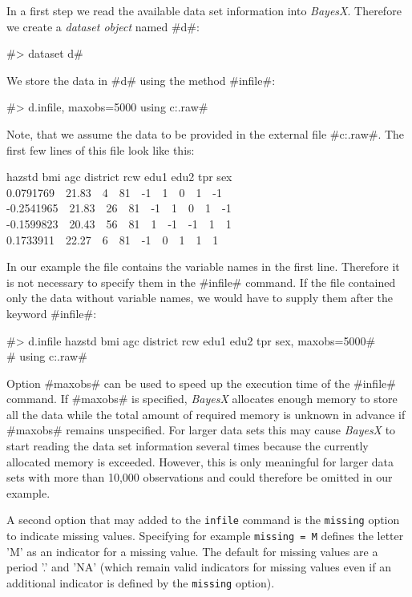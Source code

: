 \documentclass[11pt,a4paper,twoside]{bayesxreport}
\begin{document}
In a first step we read the available data set information into {\it
BayesX}. Therefore we create a {\it dataset object} named #d#:

#> dataset d#

We store the data in #d# using the method #infile#:

#> d.infile, maxobs=5000 using c:\data\zambia.raw#

Note, that we assume the data to be provided in the external file
#c:\data\zambia.raw#. The first few lines of this file look like
this:

{\footnotesize
 hazstd bmi agc district rcw edu1 edu2 tpr sex\\
 0.0791769 \,\, 21.83 \,\, 4 \,\, 81 \,\, -1 \,\, 1 \,\, 0 \,\, 1 \,\, -1\\
 -0.2541965 \,\, 21.83 \,\, 26 \,\, 81 \,\, -1 \,\, 1 \,\, 0 \,\, 1 \,\, -1\\
 -0.1599823 \,\, 20.43 \,\, 56 \,\, 81 \,\, 1 \,\, -1 \,\, -1 \,\, 1 \,\, 1\\
 0.1733911 \,\, 22.27 \,\, 6 \,\, 81 \,\, -1 \,\, 0 \,\, 1 \,\, 1 \,\, 1}

In our example the file contains the variable names in the first
line. Therefore  it is not necessary to specify them in the #infile#
command. If the file contained only the data without variable names,
we would have to supply them after the keyword #infile#:

 #> d.infile hazstd bmi agc district rcw edu1 edu2 tpr sex, maxobs=5000#\\
 #  using c:\data\zambia.raw#


Option #maxobs# can be used to speed up the execution time of the
#infile# command. If #maxobs# is specified, {\it BayesX} allocates
enough memory to store all the data while the total amount of
required memory is unknown in advance if #maxobs# remains
unspecified. For larger data sets this may cause {\it BayesX} to
start reading the data set information several times because the
currently allocated memory is exceeded. However, this is only
meaningful for larger data sets with more than 10,000 observations
and could therefore be omitted in our example.

A second option that may added to the {\tt infile} command is the
{\tt missing} option to indicate missing values. Specifying for
example {\tt missing = M} defines the letter 'M' as an indicator for
a missing value. The default for missing values are a period '.' and
'NA' (which remain valid indicators for missing values even if an
additional indicator is defined by the {\tt missing} option).
\end{document}
